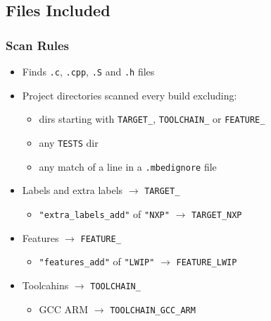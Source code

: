 \documentclass{beamer}
\begin{document}
\subsection{Files Included}
\begin{frame}
  \frametitle{Scan Rules}
  \begin{itemize}
  \item Finds \texttt{.c}, \texttt{.cpp}, \texttt{.S} and \texttt{.h} files
  \item Project directories scanned every build excluding:
    \begin{itemize}
    \item dirs starting with \texttt{TARGET\_}, \texttt{TOOLCHAIN\_} or \texttt{FEATURE\_}
    \item any \texttt{TESTS} dir
    \item any match of a line in a \texttt{.mbedignore} file
    \end{itemize}
  \item Labels and extra labels $\rightarrow$ \texttt{TARGET\_}
    \begin{itemize}
    \item \texttt{"extra\_labels\_add"} of \texttt{"NXP"} $\rightarrow$ \texttt{TARGET\_NXP}
    \end{itemize}
  \item Features $\rightarrow$ \texttt{FEATURE\_}
    \begin{itemize}
    \item \texttt{"features\_add"} of \texttt{"LWIP"} $\rightarrow$ \texttt{FEATURE\_LWIP}
    \end{itemize}
  \item Toolcahins $\rightarrow$ \texttt{TOOLCHAIN\_}
    \begin{itemize}
    \item GCC ARM $\rightarrow$ \texttt{TOOLCHAIN\_GCC\_ARM}
    \end{itemize}
  \end{itemize}
\end{frame}
\end{document}

